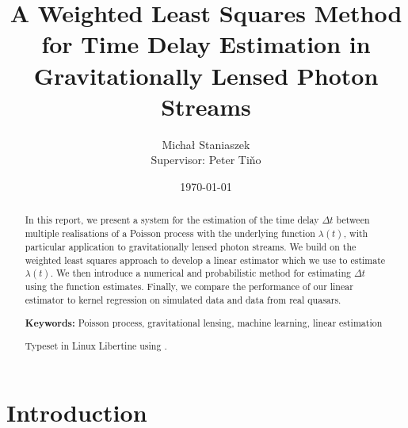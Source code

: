 \documentclass[a4paper,11pt]{article}
\title{A Weighted Least Squares Method for Time Delay Estimation in Gravitationally Lensed Photon Streams}
\author{\Large{Micha{\l} Staniaszek} \\\small{Supervisor: Peter Tiňo}}
\date{\today}
\begin{document}
\maketitle


\thispagestyle{empty}
\newpage
{}
\begin{abstract}
In this report, we present a system for the estimation of the time delay $\Delta
t$ between multiple realisations of a Poisson process with the underlying
function $\lambda(t)$, with particular application to gravitationally lensed
photon streams. We build on the weighted least squares approach to develop a
linear estimator which we use to estimate $\lambda(t)$. We then introduce a
numerical and probabilistic method for estimating $\Delta t$ using the function
estimates. Finally, we compare the performance of our linear estimator to kernel
regression on simulated data and data from real quasars.

\vspace{1.0cm}\textbf{Keywords: }Poisson process, gravitational lensing,
 machine learning, linear estimation

\begin{center}
\vspace*{\fill}\scriptsize{Typeset in Linux Libertine using \XeLaTeX}.
\end{center}
\end{abstract}
\newpage
\tableofcontents
\newpage
{}
\section{Introduction}
\label{sec-1}
\end{document}
